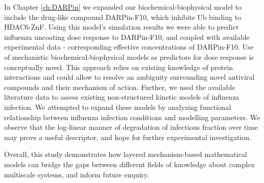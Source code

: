 In Chapter \ref{ch:DARPin} we expanded our biochemical-biophysical model to include the drug-like compound DARPin-F10, which inhibits Ub binding to HDAC6-ZnF. Using this model's simulation results we were able to predict influenza uncoating dose response to DARPin-F10, and coupled with available experimental data - corresponding effective concentrations of DARPin-F10. Use of mechanistic biochemical-biophysical models as predictors for dose response is conceptually novel. This approach relies on existing knowledge of protein interactions and could allow to resolve an ambiguity surrounding novel antiviral compounds and their mechanism of action. Further, we used the available literature data \cite{rudiger2019multiscale, schulze2009infection} to assess existing non-structured kinetic models of influenza infection. We attempted to expand these models by analyzing functional relationship between influenza infection conditions and modelling parameters. We observe that the log-linear manner of degradation of infectious fraction over time may prove a useful descriptor, and hope for further experimental investigation. 

Overall, this study demonstrates how layered mechanism-based mathematical models can bridge the gaps between different fields of knowledge about complex multiscale systems, and inform future enquiry.